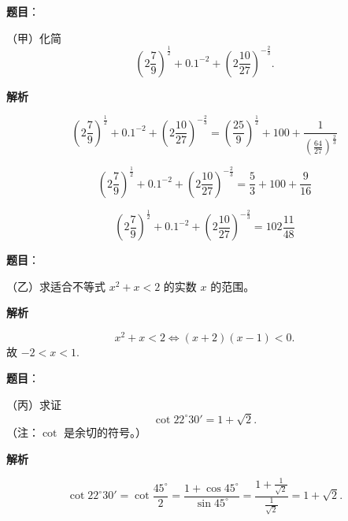 


\begin{answer}

\textbf{题目}：

（甲）化简
\[
\left(2\frac79\right)^{\frac12}+0.1^{-2}+\left(2\frac{10}{27}\right)^{-\frac23}.
\]

\textbf{解析}

\[
\left(2\frac79\right)^{\frac12}+0.1^{-2}+\left(2\frac{10}{27}\right)^{-\frac23}
=\left(\frac{25}{9}\right)^{\frac12}+100+\frac{1}{\left(\frac{64}{27}\right)^{\frac23}}
\]

\[
\left(2\frac79\right)^{\frac12}+0.1^{-2}+\left(2\frac{10}{27}\right)^{-\frac23}
=\frac53+100+\frac9{16}
\]

\[
\left(2\frac79\right)^{\frac12}+0.1^{-2}+\left(2\frac{10}{27}\right)^{-\frac23}
=102\frac{11}{48}
\]


\end{answer}
\begin{answer}

\textbf{题目}：

（乙）求适合不等式 $x^2+x<2$ 的实数 $x$ 的范围。

\textbf{解析}

\[
x^2+x<2
\iff (x+2)(x-1)<0.
\]
故 $-2<x<1$.


\end{answer}
\begin{answer}

\textbf{题目}：

（丙）求证
\[
\cot22^\circ30'=1+\sqrt2.
\]
（注：$\cot$ 是余切的符号。）

\textbf{解析}

\[
\cot22^\circ30'=\cot\frac{45^\circ}{2}
=\frac{1+\cos45^\circ}{\sin45^\circ}
=\frac{1+\frac1{\sqrt2}}{\frac1{\sqrt2}}
=1+\sqrt2.
\]


\end{answer}
